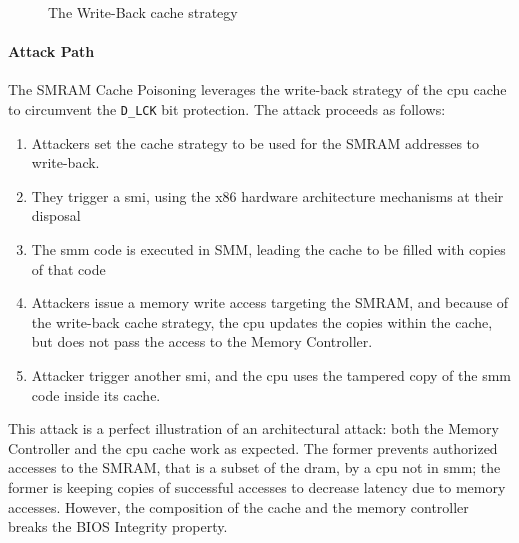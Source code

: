 \begin{figure}

  \caption{The Write-Back cache strategy}
  \label{fig:usecase:writeback}
\end{figure}

\paragraph{Attack Path}
%
The SMRAM Cache Poisoning leverages the write-back strategy of the \ac{cpu}
cache to circumvent the \texttt{D\_LCK} bit protection.
%
The attack proceeds as follows:

\begin{enumerate}
\item Attackers set the cache strategy to be used for the SMRAM addresses to
  write-back.  

%
\item They trigger a \ac{smi}, using the x86 hardware architecture mechanisms at
  their disposal 
%
\item The \ac{smm} code is executed in SMM, leading the cache to be filled with
  copies of that code
%
\item Attackers issue a memory write access targeting the SMRAM, and because of
  the write-back cache strategy, the \ac{cpu} updates the copies within the
  cache, but does not pass the access to the Memory Controller.
%
\item Attacker trigger another \ac{smi}, and the \ac{cpu} uses the tampered copy
  of the \ac{smm} code inside its cache.
\end{enumerate}
%
This attack is a perfect illustration of an architectural attack:
%
both the Memory Controller and the \ac{cpu} cache work as expected.
%
The former prevents authorized accesses to the SMRAM, that is a subset of the
\ac{dram}, by a \ac{cpu} not in \ac{smm};
%
the former is keeping copies of successful accesses to decrease latency due to
memory accesses.
%
However, the composition of the cache and the memory controller breaks the BIOS
Integrity property.

